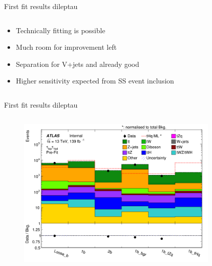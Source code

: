\begin{frame}{First fit results dileptau}
\begin{columns}
\begin{column}{0.5\textwidth}
\begin{figure}
            \end{figure}
            \begin{itemize}
                \item Technically fitting is possible
                \item Much room for improvement left
                \item Separation for V+jets and \ttbar already good
                \item Higher sensitivity expected from SS event inclusion
            \end{itemize}
        \end{column}
    \end{columns}
\end{frame}

\begin{frame}{First fit results dileptau}
    \begin{columns}
        \begin{column}{0.5\textwidth}
            \begin{figure}
                \centering
                \includegraphics[width=\textwidth]{prefot}
            \end{figure}
        \end{column}
        \begin{column}{0.5\textwidth}
            \begin{figure}
                \centering

\end{figure}
\end{column}
\end{columns}
\end{frame}
